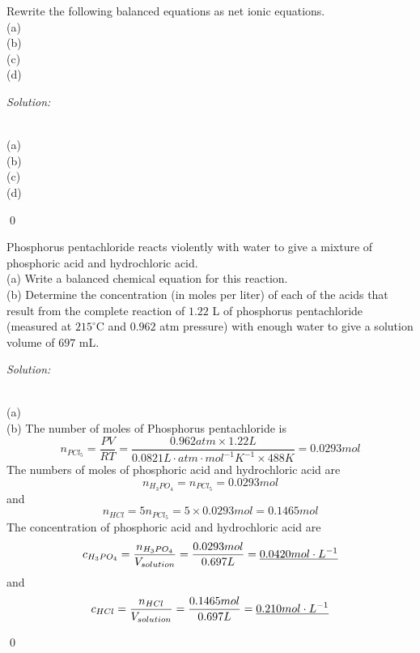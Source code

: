 \documentclass[12pt]{article}
\newenvironment{problem}[2][Problem]{\begin{trivlist}
\item[\hskip \labelsep {\bfseries #1}\hskip \labelsep {\bfseries #2.}]}{\end{trivlist}}
\newenvironment{sol}
    {\emph{Solution:}
    }
    {
    \qed
    }
\begin{document}
\begin{problem}{11.14}
Rewrite the following balanced equations as net ionic equations.\\
(a) \\
(b) \\
(c) \\
(d) 
\end{problem}
\begin{sol}
\\(a) \\
(b) \\
(c) \\
(d) 
\end{sol}

\begin{problem}{11.24}
Phosphorus pentachloride reacts violently with water to give a mixture of phosphoric acid and hydrochloric acid.\\
(a) Write a balanced chemical equation for this reaction.\\
(b) Determine the concentration (in moles per liter) of each of the acids that result from the complete reaction of $1.22$ L of phosphorus pentachloride (measured at $215 ^\circ$C and $0.962$ atm pressure) with enough water to give a solution volume of $697$ mL.
\end{problem}
\begin{sol}
\\(a) \\
(b) The number of moles of Phosphorus pentachloride is
\[
n_{PCl_5}=\frac{PV}{RT}=\frac{0.962atm\times1.22L}{0.0821L\cdot atm\cdot mol^{-1}K^{-1}\times488K}=0.0293mol
\]
The numbers of moles of phosphoric acid and hydrochloric acid are
\[
n_{H_3PO_4}=n_{PCl_5}=0.0293mol
\]
and
\[
n_{HCl}=5n_{PCl_5}=5\times0.0293mol=0.1465mol
\]
The concentration of phosphoric acid and hydrochloric acid are
\[
c_{H_3PO_4}=\frac{n_{H_3PO_4}}{V_{solution}}=\frac{0.0293mol}{0.697L}=\uline{0.0420mol\cdot L^{-1}}
\]
and
\[
c_{HCl}=\frac{n_{HCl}}{V_{solution}}=\frac{0.1465mol}{0.697L}=\uline{0.210mol\cdot L^{-1}}
\]
\end{sol}
\end{document}
